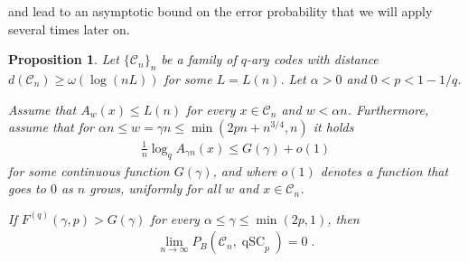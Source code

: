 \documentclass{article}
\DeclareMathOperator{\qSC}{qSC}
\newcommand{\cC}{\mathcal{C}}
\theoremstyle{plain}
\theoremstyle{plain}
\theoremstyle{plain}
\theoremstyle{plain}
\theoremstyle{plain}
\newtheorem{proposition}[definition]{Proposition}%
\theoremstyle{plain}
\theoremstyle{plain}
\theoremstyle{plain}
\theoremstyle{plain}
\theoremstyle{plain}
\theoremstyle{remark}
\theoremstyle{remark}
\theoremstyle{remark}
\theoremstyle{plain}
\begin{document}
and  lead
to an asymptotic bound on the error
probability that we will apply several
times later on.

\begin{proposition}
\label{prop:qsc-vanishing-pb}
Let $\{\cC_n\}_n$ be a family of $q$-ary codes
with distance $d(\cC_n)\ge\omega(\log(nL))$
for some $L=L(n)$.
Let $\alpha>0$ and $0<p<1-1/q$.

Assume that $A_w(x)\le L(n)$ for every $x\in\cC_n$ and
$w<\alpha n$. Furthermore, assume that
for $\alpha n\le w=\gamma n\le \min(2pn+n^{3/4}, n)$ it holds
\begin{align}
\label{eq:24}
\frac{1}{n}\log_q A_{\gamma n}(x)\le G(\gamma)+o(1)
\end{align}
for some continuous function $G(\gamma)$,
and where $o(1)$ denotes a function that goes to $0$ as
$n$ grows, uniformly for all $w$ and $x\in\cC_n$.

If $F^{(q)}(\gamma, p)>G(\gamma)$ for every
$\alpha\le \gamma\le \min(2p, 1)$, then
\begin{align*}
\lim_{n\to\infty} P_B(\cC_n, \qSC_p)=0\;.
\end{align*}
\end{proposition}
\end{document}
